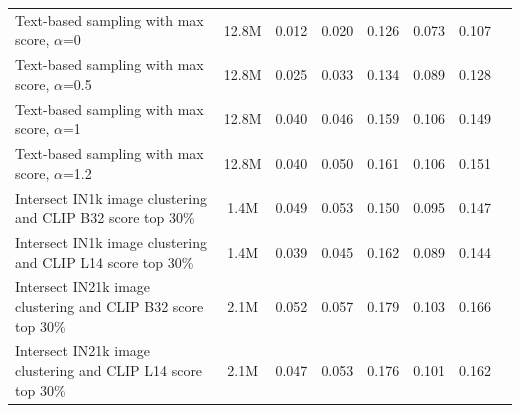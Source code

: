 \begin{table}
{\begin{tabular}{lccccccc}
        Text-based sampling with max score, $\alpha$=0 & 12.8M & 0.012 & 0.020 & 0.126 & 0.073 & 0.107  \\%
        Text-based sampling with max score, $\alpha$=0.5 & 12.8M & 0.025 & 0.033 & 0.134 & 0.089 & 0.128  \\%
        Text-based sampling with max score, $\alpha$=1 & 12.8M & 0.040 & 0.046 & 0.159 & 0.106 & 0.149  \\%
        Text-based sampling with max score, $\alpha$=1.2 & 12.8M & 0.040 & 0.050 & 0.161 & 0.106 & 0.151  \\%
        Intersect IN1k image clustering and CLIP B32 score top 30\% & 1.4M & 0.049 & 0.053 & 0.150 & 0.095 & 0.147  \\%
        Intersect IN1k image clustering and CLIP L14 score top 30\% & 1.4M & 0.039 & 0.045 & 0.162 & 0.089 & 0.144  \\%
        Intersect IN21k image clustering and CLIP B32 score top 30\% & 2.1M & 0.052 & 0.057 & 0.179 & 0.103 & 0.166  \\%
        Intersect IN21k image clustering and CLIP L14 score top 30\% & 2.1M & 0.047 & 0.053 & 0.176 & 0.101 & 0.162  \\%
        \bottomrule
    \end{tabular}
    }
\label{tab:full-small}
\end{table}
\newpage
